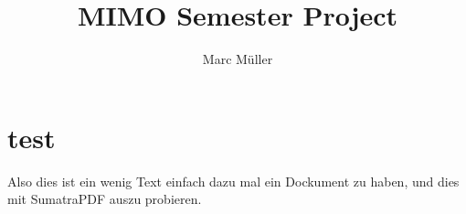 \documentclass[9pt,draft]{report}
\begin{document}
\author{Marc Müller}
\title{MIMO Semester Project}

\section{test}
Also dies ist ein wenig Text einfach dazu mal ein Dockument zu haben, und dies mit SumatraPDF auszu probieren.
\end{document}
